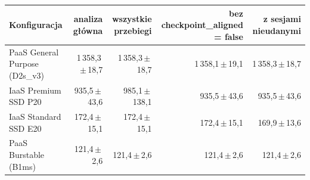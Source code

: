 \begin{tabular}{lrrrr}
\toprule
Konfiguracja & analiza główna & wszystkie przebiegi & bez checkpoint\_aligned = false & z sesjami nieudanymi \\
\midrule
PaaS General Purpose (D2s\_v3) & 1\,358,3\,$\pm$\,18,7 & 1\,358,3\,$\pm$\,18,7 & 1\,358,1\,$\pm$\,19,1 & 1\,358,3\,$\pm$\,18,7 \\
IaaS Premium SSD P20 & 935,5\,$\pm$\,43,6 & 985,1\,$\pm$\,138,1 & 935,5\,$\pm$\,43,6 & 935,5\,$\pm$\,43,6 \\
IaaS Standard SSD E20 & 172,4\,$\pm$\,15,1 & 172,4\,$\pm$\,15,1 & 172,4\,$\pm$\,15,1 & 169,9\,$\pm$\,13,6 \\
PaaS Burstable (B1ms) & 121,4\,$\pm$\,2,6 & 121,4\,$\pm$\,2,6 & 121,4\,$\pm$\,2,6 & 121,4\,$\pm$\,2,6 \\
\bottomrule
\end{tabular}
